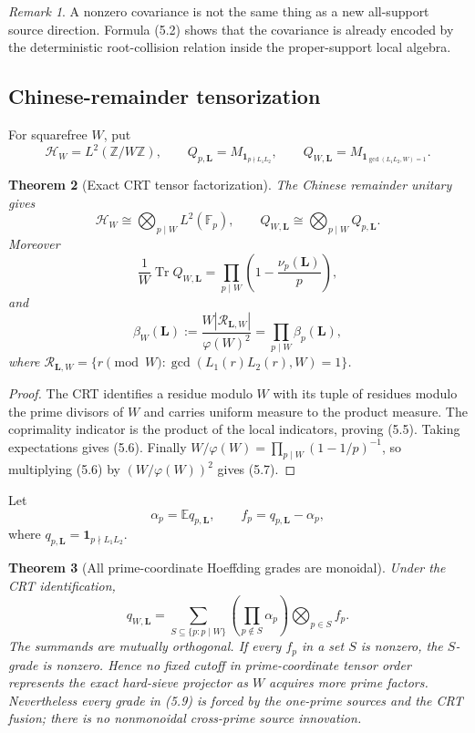 \documentclass[11pt]{article}
\newtheorem{theorem}{Theorem}[section]
\theoremstyle{definition}
\theoremstyle{remark}
\newtheorem{remark}[theorem]{Remark}
\newcommand{\Z}{\mathbb Z}
\newcommand{\F}{\mathbb F}
\newcommand{\one}{\mathbf 1}
\newcommand{\Tr}{\operatorname{Tr}}
\newcommand{\abs}[1]{\left\lvert#1\right\rvert}
\begin{document}
\begin{remark}
A nonzero covariance is not the same thing as a new all-support source
direction.  Formula \textup{(5.2)} shows that the covariance is already encoded
by the deterministic root-collision relation inside the proper-support local
algebra.
\end{remark}

\subsection{Chinese-remainder tensorization}

For squarefree $W$, put
\[
 \mathcal H_W=L^2(\Z/W\Z),
 \qquad
 Q_{p,\bm L}=M_{\one_{p\nmid L_1L_2}},
 \qquad
 Q_{W,\bm L}=M_{\one_{\gcd(L_1L_2,W)=1}}.
 \tag{5.4}
\]

\begin{theorem}[Exact CRT tensor factorization]
\label{thm:CRT-tensor}
The Chinese remainder unitary gives
\[
 \boxed{
 \mathcal H_W\cong\bigotimes_{p\mid W}L^2(\F_p),
 \qquad
 Q_{W,\bm L}\cong\bigotimes_{p\mid W}Q_{p,\bm L}.}
 \tag{5.5}
\]
Moreover
\[
 \boxed{
 \frac1W\Tr Q_{W,\bm L}
 =\prod_{p\mid W}\left(1-\frac{\nu_p(\bm L)}p\right),}
 \tag{5.6}
\]
and
\[
 \boxed{
 \beta_W(\bm L)
 :=\frac{W\abs{\mathcal R_{\bm L,W}}}{\varphi(W)^2}
 =\prod_{p\mid W}\beta_p(\bm L),}
 \tag{5.7}
\]
where
$\mathcal R_{\bm L,W}=\{r\pmod W:\gcd(L_1(r)L_2(r),W)=1\}$.
\end{theorem}

\begin{proof}
The CRT identifies a residue modulo $W$ with its tuple of residues modulo the
prime divisors of $W$ and carries uniform measure to the product measure.  The
coprimality indicator is the product of the local indicators, proving
\textup{(5.5)}.  Taking expectations gives \textup{(5.6)}.  Finally
$W/\varphi(W)=\prod_{p\mid W}(1-1/p)^{-1}$, so multiplying
\textup{(5.6)} by $(W/\varphi(W))^2$ gives \textup{(5.7)}.
\end{proof}

Let
\[
 \alpha_p=\mathbb E q_{p,\bm L},
 \qquad
 f_p=q_{p,\bm L}-\alpha_p,
 \tag{5.8}
\]
where $q_{p,\bm L}=\one_{p\nmid L_1L_2}$.

\begin{theorem}[All prime-coordinate Hoeffding grades are monoidal]
\label{thm:prime-Hoeffding}
Under the CRT identification,
\[
 \boxed{
 q_{W,\bm L}
 =\sum_{S\subseteq\{p:p\mid W\}}
   \left(\prod_{p\notin S}\alpha_p\right)
   \bigotimes_{p\in S}f_p.}
 \tag{5.9}
\]
The summands are mutually orthogonal.  If every $f_p$ in a set $S$ is nonzero,
the $S$-grade is nonzero.  Hence no fixed cutoff in prime-coordinate tensor
order represents the exact hard-sieve projector as $W$ acquires more prime
factors.  Nevertheless every grade in \textup{(5.9)} is forced by the one-prime
sources and the CRT fusion; there is no nonmonoidal cross-prime source
innovation.
\end{theorem}
\end{document}
